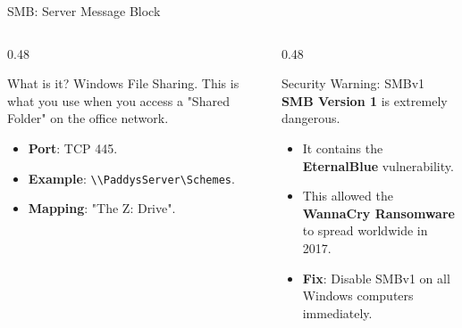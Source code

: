 \documentclass[aspectratio=169]{beamer}  %
\begin{document}
\begin{frame}{SMB: Server Message Block}
    \begin{columns}[T]
        \begin{column}{0.48\textwidth}
            \begin{block}{What is it?}
                \small
                Windows File Sharing. This is what you use when you access a "Shared Folder" on the office network.
                \begin{itemize}
                    \item \textbf{Port}: TCP 445.
                    \item \textbf{Example}: \texttt{\textbackslash\textbackslash PaddysServer\textbackslash Schemes}.
                    \item \textbf{Mapping}: "The Z: Drive".
                \end{itemize}
            \end{block}
        \end{column}
        \begin{column}{0.48\textwidth}
            \begin{alertblock}{Security Warning: SMBv1}
                \small
                \textbf{SMB Version 1} is extremely dangerous.
                \begin{itemize}
                    \item It contains the \textbf{EternalBlue} vulnerability.
                    \item This allowed the \textbf{WannaCry Ransomware} to spread worldwide in 2017.
                    \item \textbf{Fix}: Disable SMBv1 on all Windows computers immediately.
                \end{itemize}
            \end{alertblock}
        \end{column}
    \end{columns}
\end{frame}
\end{document}
